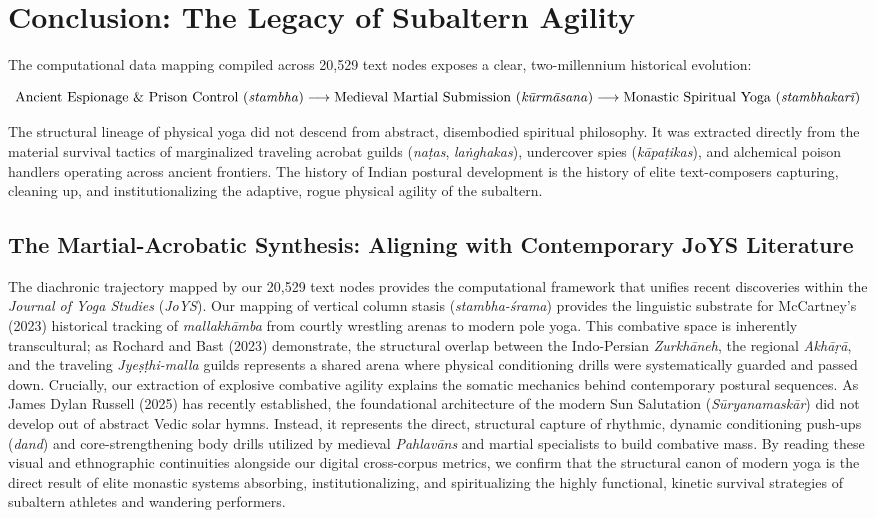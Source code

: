 \documentclass[11pt,letterpaper]{article}
\begin{document}
\section{Conclusion: The Legacy of Subaltern Agility}
The computational data mapping compiled across 20,529 text nodes exposes a clear, two-millennium historical evolution:

\[
\text{Ancient Espionage \& Prison Control (\textit{stambha})} \longrightarrow \text{Medieval Martial Submission (\textit{kūrmāsana})} \longrightarrow \text{Monastic Spiritual Yoga (\textit{stambhakarī})}
\]

The structural lineage of physical yoga did not descend from abstract, disembodied spiritual philosophy. It was extracted directly from the material survival tactics of marginalized traveling acrobat guilds (\textit{naṭas}, \textit{laṅghakas}), undercover spies (\textit{kāpaṭikas}), and alchemical poison handlers operating across ancient frontiers. The history of Indian postural development is the history of elite text-composers capturing, cleaning up, and institutionalizing the adaptive, rogue physical agility of the subaltern.

\subsection{The Martial-Acrobatic Synthesis: Aligning with Contemporary JoYS Literature}
The diachronic trajectory mapped by our 20,529 text nodes provides the computational framework that unifies recent discoveries within the \textit{Journal of Yoga Studies} (\textit{JoYS}). Our mapping of vertical column stasis (\textit{stambha-śrama}) provides the linguistic substrate for McCartney’s (2023) historical tracking of \textit{mallakhāmba} from courtly wrestling arenas to modern pole yoga. This combative space is inherently transcultural; as Rochard and Bast (2023) demonstrate, the structural overlap between the Indo-Persian \textit{Zurkhāneh}, the regional \textit{Akhāṛā}, and the traveling \textit{Jyeṣṭhi-malla} guilds represents a shared arena where physical conditioning drills were systematically guarded and passed down. Crucially, our extraction of explosive combative agility explains the somatic mechanics behind contemporary postural sequences. As James Dylan Russell (2025) has recently established, the foundational architecture of the modern Sun Salutation (\textit{Sūryanamaskār}) did not develop out of abstract Vedic solar hymns. Instead, it represents the direct, structural capture of rhythmic, dynamic conditioning push-ups (\textit{dand}) and core-strengthening body drills utilized by medieval \textit{Pahlavāns} and martial specialists to build combative mass. By reading these visual and ethnographic continuities alongside our digital cross-corpus metrics, we confirm that the structural canon of modern yoga is the direct result of elite monastic systems absorbing, institutionalizing, and spiritualizing the highly functional, kinetic survival strategies of subaltern athletes and wandering performers.
\end{document}
